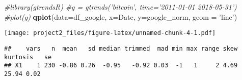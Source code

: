 \documentclass[
]{article}
\newenvironment{Shaded}{\begin{snugshade}}{\end{snugshade}}
\newcommand{\CommentTok}[1]{\textcolor[rgb]{0.56,0.35,0.01}{\textit{#1}}}
\newcommand{\DataTypeTok}[1]{\textcolor[rgb]{0.13,0.29,0.53}{#1}}
\newcommand{\KeywordTok}[1]{\textcolor[rgb]{0.13,0.29,0.53}{\textbf{#1}}}
\newcommand{\NormalTok}[1]{#1}
\newcommand{\OperatorTok}[1]{\textcolor[rgb]{0.81,0.36,0.00}{\textbf{#1}}}
\newcommand{\StringTok}[1]{\textcolor[rgb]{0.31,0.60,0.02}{#1}}
\begin{document}
\begin{Shaded}
\begin{Highlighting}[]
\CommentTok{#library(gtrendsR)}
\CommentTok{#g = gtrends('bitcoin', time='2011-01-01 2018-05-31')}
\CommentTok{#plot(g)}
\KeywordTok{qplot}\NormalTok{(}\DataTypeTok{data=}\NormalTok{df_google, }\DataTypeTok{x=}\NormalTok{Date, }\DataTypeTok{y=}\NormalTok{google_norm, }\DataTypeTok{geom =} \StringTok{'line'}\NormalTok{)}
\end{Highlighting}
\end{Shaded}

\texttt{[image: project2\_files/figure-latex/unnamed-chunk-4-1.pdf]}

\begin{Shaded}
\end{Shaded}

\begin{verbatim}
##    vars   n  mean   sd median trimmed  mad min max range skew kurtosis   se
## X1    1 230 -0.86 0.26  -0.95   -0.92 0.03  -1   1     2 4.69    25.94 0.02
\end{verbatim}

\begin{Shaded}
\end{Shaded}
\end{document}
